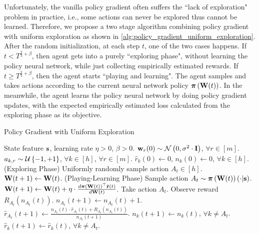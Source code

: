 Unfortunately, the vanilla policy gradient often suffers the ``lack of exploration" problem in practice, i.e., some actions can never be explored thus cannot be learned. Therefore, we propose a two stage algorithm combining policy gradient with uniform exploration as shown in \cref{alg:policy_gradient_uniform_exploration}. After the random initialization, at each step $t$, one of the two cases happens. If $t < T^{\frac{2}{3} + \beta}$, then agent gets into a purely ``exploring phase", without learning the policy neural network, while just collecting empirically estimated rewards. If $t \ge T^{\frac{2}{3} + \beta}$, then the agent starts ``playing and learning". The agent samples and takes actions according to the current neural network policy ${\boldsymbol{\pi}}\left({\mathbf{W}}(t)\right)$. In the meanwhile, the agent learns the policy neural network by doing policy gradient updates, with the expected empirically estimated loss calculated from the exploring phase as its objective.

\begin{algorithm}[t]
   \caption{Policy Gradient with Uniform Exploration}
\label{alg:policy_gradient_uniform_exploration}
\begin{algorithmic}
    State feature ${\mathbf{s}}$, learning rate $\eta > 0$, $\beta > 0$.
   \STATE ${\mathbf{w}}_r(0) \sim {\mathcal{N}}\left( 0, \sigma^2 \cdot {\mathbf{I}} \right)$, $\forall r \in [m]$.
   \STATE $a_{k, r} \sim {\mathcal{U}}\left\{-1, +1\right\}$, $\forall k \in [h]$, $\forall r \in [m]$.
   \STATE $\hat{r}_{k}\left(0\right) \gets 0$, $n_{k}\left(0\right) \gets 0$, $\forall k \in [h]$.
   \STATE (Exploring Phase)
   \STATE Uniformly randomly sample action $A_{t} \in [h]$.
   \STATE ${\mathbf{W}}(t+1) \leftarrow {\mathbf{W}}(t)$.
   \ELSE
   \STATE (Playing-Learning Phase)
   \STATE Sample action $A_{t} \sim {\boldsymbol{\pi}}\left({\mathbf{W}}(t)\right)\left(\cdot \middle| {\mathbf{s}} \right)$.
   \STATE ${\mathbf{W}}(t+1) \leftarrow {\mathbf{W}}(t) + \eta \cdot \frac{d {\boldsymbol{\pi}}\left({\mathbf{W}}(t)\right)^\top \hat{{\mathbf{r}}} \left(t\right)}{d {\mathbf{W}}(t)}$.
   \ENDIF
   \STATE Take action $A_{t}$. Observe reward $R_{ A_{t}}\left(n_{ A_{t}}\left(t\right) \right)$.
   \STATE $n_{ A_{t}}\left(t+1\right) \gets n_{ A_{t}}\left(t\right) + 1$.
   \STATE $\hat{r}_{A_{t}}\left(t+1\right) \gets \frac{n_{ A_{t}}\left(t\right) \cdot \hat{r}_{A_{t}}\left(t\right) + R_{ A_{t}}\left(n_{A_{t}}\left(t\right)\right) }{n_{ A_{t}}\left(t+1\right)}$.
   \STATE $n_{ k}\left(t+1\right) \gets n_{ k}\left(t\right)$, $\forall k \not= A_t$.
   \STATE $\hat{r}_{k}\left(t+1\right) \gets \hat{r}_{k}\left(t\right)$, $\forall k \not= A_t$.
   \ENDFOR
\end{algorithmic}
\end{algorithm}

